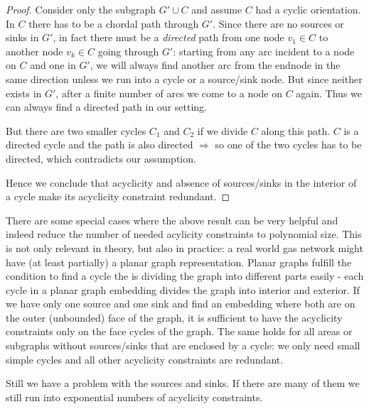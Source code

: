 \begin{proof}
 Consider only the subgraph $G'\cup C$ and assume $C$ had a cyclic orientation. In $C$ there has to be a chordal path 
through $G'$. Since there are no sources or sinks in $G'$, in fact there must be a \textit{directed} path from one node 
$v_1 \in C$ to another node $v_k\in C$ going through $G'$: starting from any arc incident to a node on $C$ and one in 
$G'$, we will always find another arc from the endnode in the same direction unless we run into a cycle or a 
source/sink node. But since neither exists in $G'$, after a finite number of arcs we come to a node on $C$ again. Thus 
we can always find a directed path in our setting. 

But there are two smaller cycles $C_1$ and $C_2$ if we divide $C$ along this path. $C$ is a directed cycle and the path 
is also directed $\Rightarrow$ so one of the two cycles has to be directed, which contradicts our assumption. 
\Lightning 

Hence we conclude that acyclicity and absence of sources/sinks in the interior of a cycle make its acyclicity 
constraint redundant.
\end{proof}

There are some special cases where the above result can be very helpful and indeed reduce the number of needed 
acylicity constraints to polynomial size. This is not only relevant in theory, but also in practice: a real world gas 
network might have (at least partially) a planar graph representation. Planar graphs fulfill the condition to find a 
cycle the is dividing the graph into different parts easily - each cycle in a planar graph embedding divides the graph 
into interior and exterior. If we have only one source and one sink and find an embedding where both are on the outer 
(unbounded) face of the graph, it is sufficient to have the acyclicity constraints only on the face cycles of the 
graph. The same holds for all areas or subgraphs without sources/sinks that are enclosed by a cycle: we only need small 
simple cycles and all other acyclicity constraints are redundant.

Still we have a problem with the sources and sinks. If there are many of them we still run into exponential numbers of 
acyclicity constraints.




